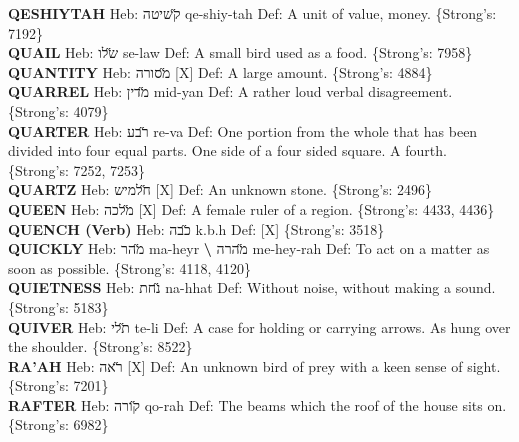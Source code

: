 {\textbf{QESHIYTAH} Heb: {\large\H קשיטה} qe-shiy-tah Def: A unit of value, money. \{Strong's: 7192\}\hfill{}\\

\textbf{QUAIL} Heb: {\large\H שלו} se-law Def: A small bird used as a food. \{Strong's: 7958\}\hfill{}\\

\textbf{QUANTITY} Heb: {\large\H מסורה} {[}X{]} Def: A large amount. \{Strong's: 4884\}\hfill{}\\

\textbf{QUARREL} Heb: {\large\H מדין} mid-yan Def: A rather loud verbal disagreement. \{Strong's: 4079\}\hfill{}\\

\textbf{QUARTER} Heb: {\large\H רבע} re-va Def: One portion from the whole that has been divided into four equal parts. One side of a four sided square. A fourth. \{Strong's: 7252, 7253\}\hfill{}\\

\textbf{QUARTZ} Heb: {\large\H חלמיש} {[}X{]} Def: An unknown stone. \{Strong's: 2496\}\hfill{}\\

\textbf{QUEEN} Heb: {\large\H מלכה} {[}X{]} Def: A female ruler of a region. \{Strong's: 4433, 4436\}\hfill{}\\

\textbf{QUENCH (Verb)} Heb: {\large\H כבה} k.b.h Def: {[}X{]} \{Strong's: 3518\}\hfill{}\\

\textbf{QUICKLY} Heb: {\large\H מהר} ma-heyr \textbf{\textbackslash{}} {\large\H מהרה} me-hey-rah Def: To act on a matter as soon as possible. \{Strong's: 4118, 4120\}\hfill{}\\

\textbf{QUIETNESS} Heb: {\large\H נחת} na-hhat Def: Without noise, without making a sound. \{Strong's: 5183\}\hfill{}\\

\textbf{QUIVER} Heb: {\large\H תלי} te-li Def: A case for holding or carrying arrows. As hung over the shoulder. \{Strong's: 8522\}\hfill{}\\

\textbf{RA'AH} Heb: {\large\H ראה} {[}X{]} Def: An unknown bird of prey with a keen sense of sight. \{Strong's: 7201\}\hfill{}\\

\textbf{RAFTER} Heb: {\large\H קורה} qo-rah Def: The beams which the roof of the house sits on. \{Strong's: 6982\}\hfill{}\\

}
